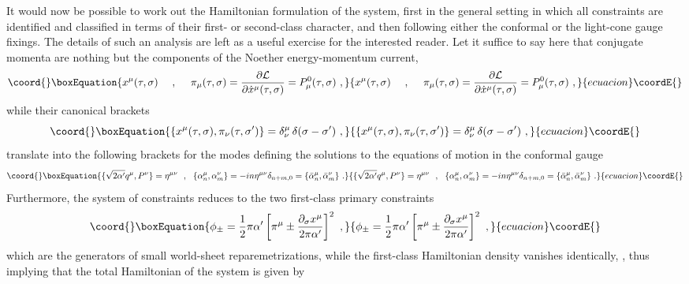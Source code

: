 \documentclass[a4paper,11pt]{article}
\begin{document}
It would now be possible to work out the Hamiltonian formulation of the
system, first in the general setting in which all constraints are
identified and classified in terms of their first- or second-class character,
and then following either the conformal or the light-cone gauge fixings.
The details of such an analysis are left as a useful exercise for the
interested reader.\cite{JG10,JG11} Let it suffice to say here that conjugate 
momenta are nothing but the \coordHE{} components of the Noether 
energy-momentum current,
\begin{equation}\coord{}\boxEquation{
x^\mu(\tau,\sigma)\ \ \ \ ,\ \ \ \ 
\pi_\mu(\tau,\sigma)=\frac{\partial{\cal L}}{\partial\dot{x}^\mu(\tau,\sigma)}
=P^0_\mu(\tau,\sigma)\ ,
}{
x^\mu(\tau,\sigma)\ \ \ \ ,\ \ \ \ 
\pi_\mu(\tau,\sigma)=\frac{\partial{\cal L}}{\partial\dot{x}^\mu(\tau,\sigma)}
=P^0_\mu(\tau,\sigma)\ ,
}{ecuacion}\coordE{}\end{equation}
while their canonical brackets
\begin{equation}\coord{}\boxEquation{
\{x^\mu(\tau,\sigma),\pi_\nu(\tau,\sigma')\}=\delta^\mu_\nu\,
\delta(\sigma-\sigma')\ ,
}{
\{x^\mu(\tau,\sigma),\pi_\nu(\tau,\sigma')\}=\delta^\mu_\nu\,
\delta(\sigma-\sigma')\ ,
}{ecuacion}\coordE{}\end{equation}
translate into the following brackets for the modes defining the solutions
to the equations of motion in the conformal gauge
\begin{equation}\coord{}\boxEquation{
\{\sqrt{2\alpha'}q^\mu,P^\nu\}=\eta^{\mu\nu}\ \ ,\ \ 
\{\alpha^\mu_n,\alpha^\nu_m\}=-in\eta^{\mu\nu}\delta_{n+m,0}=
\{\bar{\alpha}^\mu_n,\bar{\alpha}^\nu_m\}\ .
}{
\{\sqrt{2\alpha'}q^\mu,P^\nu\}=\eta^{\mu\nu}\ \ ,\ \ 
\{\alpha^\mu_n,\alpha^\nu_m\}=-in\eta^{\mu\nu}\delta_{n+m,0}=
\{\bar{\alpha}^\mu_n,\bar{\alpha}^\nu_m\}\ .
}{ecuacion}\coordE{}\end{equation}
Furthermore, the system of constraints reduces to the two first-class 
primary constraints
\begin{equation}\coord{}\boxEquation{
\phi_\pm=\frac{1}{2}\pi\alpha'
\left[\pi^\mu\pm\frac{\partial_\sigma x^\mu}{2\pi\alpha'}\right]^2\ ,
}{
\phi_\pm=\frac{1}{2}\pi\alpha'
\left[\pi^\mu\pm\frac{\partial_\sigma x^\mu}{2\pi\alpha'}\right]^2\ ,
}{ecuacion}\coordE{}\end{equation}
which are the generators of small world-sheet reparemetrizations,
while the first-class Hamiltonian density vanishes identically, \coordHE{},
thus implying that the total Hamiltonian of the system is given by
\end{document}
